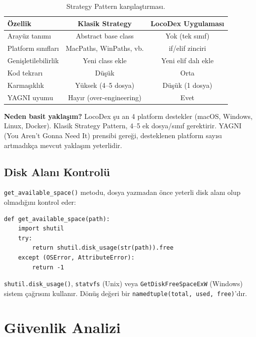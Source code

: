\begin{table}[H]
\centering
\caption{Strategy Pattern kar\c{s}{\i}la\c{s}t{\i}rmas{\i}.}
\label{tab:strategy-comparison}
\begin{tabular}{lcc}
\toprule
\textbf{\"{O}zellik} & \textbf{Klasik Strategy} & \textbf{LocoDex Uygulamas{\i}} \\
\midrule
Aray\"{u}z tan{\i}m{\i} & Abstract base class & Yok (tek s{\i}n{\i}f) \\
Platform s{\i}n{\i}flar{\i} & MacPaths, WinPaths, vb. & if/elif zinciri \\
Geni\c{s}letilebilirlik & Yeni class ekle & Yeni elif dal{\i} ekle \\
Kod tekrar{\i} & D\"{u}\c{s}\"{u}k & Orta \\
Karma\c{s}{\i}kl{\i}k & Y\"{u}ksek (4--5 dosya) & D\"{u}\c{s}\"{u}k (1 dosya) \\
YAGNI uyumu & Hay{\i}r (over-engineering) & Evet \\
\bottomrule
\end{tabular}
\end{table}

\textbf{Neden basit yakla\c{s}{\i}m?} LocoDex \c{s}u an 4 platform destekler (macOS, Windows, Linux, Docker). Klasik Strategy Pattern, 4--5 ek dosya/s{\i}n{\i}f gerektirir. YAGNI (You Aren't Gonna Need It) prensibi gere\u{g}i, desteklenen platform say{\i}s{\i} artmad{\i}k\c{c}a mevcut yakla\c{s}{\i}m yeterlidir.

\subsection{Disk Alan{\i} Kontrol\"{u}}

\texttt{get\_available\_space()} metodu, dosya yazmadan \"{o}nce yeterli disk alan{\i} olup olmad{\i}\u{g}{\i}n{\i} kontrol eder:

\begin{verbatim}
def get_available_space(path):
    import shutil
    try:
        return shutil.disk_usage(str(path)).free
    except (OSError, AttributeError):
        return -1
\end{verbatim}

\texttt{shutil.disk\_usage()}, \texttt{statvfs} (Unix) veya \texttt{GetDiskFreeSpaceExW} (Windows) sistem \c{c}a\u{g}r{\i}s{\i}n{\i} kullan{\i}r. D\"{o}n\"{u}\c{s} de\u{g}eri bir \texttt{namedtuple(total, used, free)}'d{\i}r.

\section{G\"{u}venlik Analizi}
\label{sec:security}

